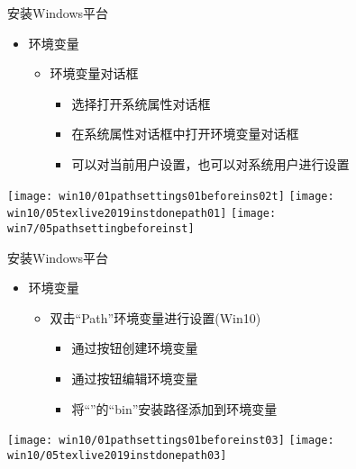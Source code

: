 \documentclass[fontset = none, t]{ctexbeamer}
\begin{document}
\begin{frame}{安装\tl}{Windows平台}
  \begin{spacing}{1.5}
    \begin{itemize}
    \item 环境变量
      \begin{itemize}
      \item 环境变量对话框
        \begin{itemize}
        \item 选择打开系统属性对话框
        \item 在系统属性对话框中打开环境变量对话框
        \item 可以对当前用户设置，也可以对系统用户进行设置
        \end{itemize}
      \end{itemize}
    \end{itemize}
    \begin{center}
      \texttt{[image: win10/01pathsettings01beforeins02t]}
      \texttt{[image: win10/05texlive2019instdonepath01]}
      \texttt{[image: win7/05pathsettingbeforeinst]}
    \end{center}
  \end{spacing}         
\end{frame}

\begin{frame}{安装\tl}{Windows平台}
  \begin{spacing}{1.2}
    \begin{itemize}
    \item 环境变量
      \begin{itemize}
      \item 双击\enquote{Path}环境变量进行设置(Win10)
        \begin{itemize}
        \item 通过按钮创建环境变量
        \item 通过按钮编辑环境变量
        \item 将\enquote{\tl}的\enquote{bin}安装路径添加到环境变量          
        \end{itemize}
      \end{itemize}
    \end{itemize}
    \begin{center}
      \texttt{[image: win10/01pathsettings01beforeinst03]}
      \texttt{[image: win10/05texlive2019instdonepath03]}
    \end{center}
  \end{spacing}         
\end{frame}
\end{document}
